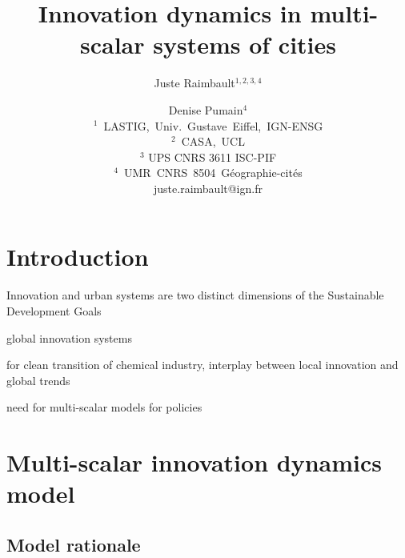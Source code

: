 \documentclass[letterpaper]{article}
\title{Innovation dynamics in multi-scalar systems of cities}
\author{Juste Raimbault$^{1,2,3,4}$ \and Denise Pumain$^{4}$\\
\mbox{$^1$ LASTIG, Univ. Gustave Eiffel, IGN-ENSG}\\
\mbox{$^2$ CASA, UCL}\\
\mbox{$^3$} UPS CNRS 3611 ISC-PIF\\
\mbox{$^4$ UMR CNRS 8504 G{\'e}ographie-cit{\'e}}s\\
juste.raimbault@ign.fr}
\begin{document}
\maketitle

\begin{abstract}
  
\end{abstract}


\section{Introduction}

Innovation and urban systems are two distinct dimensions of the Sustainable Development Goals

% 
\cite{binz2017global} global innovation systems

\cite{bauer2019local} for clean transition of chemical industry, interplay between local innovation and global trends

\cite{rozenblat2018conclusion} need for multi-scalar models for policies

\cite{rozenblat2007firm}


\cite{raimbault2021multiscale}

\cite{raimbault2021strong}


\cite{seth2010measuring} 

\cite{rosas2020reconciling}




\section{Multi-scalar innovation dynamics model}

\subsection{Model rationale}

\end{document}
